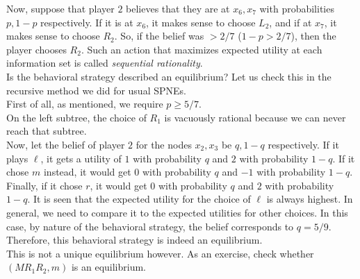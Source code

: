 \begin{fex}
\begin{center}
			\end{center}
			Now, suppose that player $2$ believes that they are at $x_6,x_7$ with probabilities $p,1-p$ respectively. If it is at $x_6$, it makes sense to choose $L_2$, and if at $x_7$, it makes sense to choose $R_2$. So, if the belief was $>2/7$ ($1-p > 2/7$), then the player chooses $R_2$. Such an action that maximizes expected utility at each information set is called \emph{sequential rationality}.\\
			
			Is the behavioral strategy described an equilibrium? Let us check this in the recursive method we did for usual SPNEs.\\
			First of all, as mentioned, we require $p \ge 5/7$.\\
			On the left subtree, the choice of $R_1$ is vacuously rational because we can never reach that subtree.\\
			Now, let the belief of player $2$ for the nodes $x_2,x_3$ be $q,1-q$ respectively. If it plays $\ell$, it gets a utility of $1$ with probability $q$ and $2$ with probability $1-q$. If it chose $m$ instead, it would get $0$ with probability $q$ and $-1$ with probability $1-q$. Finally, if it chose $r$, it would get $0$ with probability $q$ and $2$ with probability $1-q$. It is seen that the expected utility for the choice of $\ell$ is always highest. In general, we need to compare it to the expected utilities for other choices. In this case, by nature of the behavioral strategy, the belief corresponds to $q = 5/9$.\\
			Therefore, this behavioral strategy is indeed an equilibrium.\\
			This is not a unique equilibrium however. As an exercise, check whether $(MR_1R_2,m)$ is an equilibrium.
		\end{fex}
		

